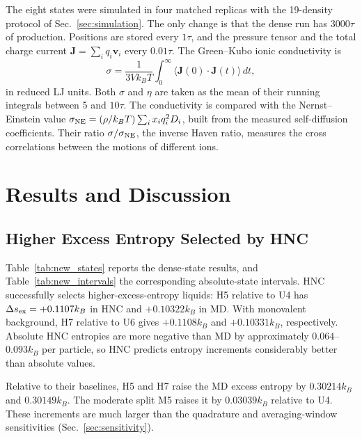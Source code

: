 \documentclass[aps,pre,twocolumn,superscriptaddress,floatfix]{revtex4-2}
\begin{document}
The eight states were simulated in four matched replicas with the 19-density protocol of Sec.~\ref{sec:simulation}. The only change is that the dense run has $3000\tau$ of production. Positions are stored every $1\tau$, and the pressure tensor and the total charge current $\mathbf J=\sum_i q_i\mathbf v_i$ every $0.01\tau$. The Green--Kubo ionic conductivity is
\begin{equation}
\sigma=\frac{1}{3Vk_BT}\int_0^\infty\langle\mathbf J(0)\cdot\mathbf J(t)\rangle\,dt,
\label{eq:gk_conductivity}
\end{equation}
in reduced LJ units. Both $\sigma$ and $\eta$ are taken as the mean of their running integrals between 5 and $10\tau$. The conductivity is compared with the Nernst--Einstein value $\sigma_{\rm NE}=(\rho/k_BT)\sum_ix_iq_i^2D_i$, built from the measured self-diffusion coefficients. Their ratio $\sigma/\sigma_{\rm NE}$, the inverse Haven ratio, measures the cross correlations between the motions of different ions.



\section{Results and Discussion}
\label{sec:results}

\subsection{Higher Excess Entropy Selected by HNC}

Table~\ref{tab:new_states} reports the dense-state results, and Table~\ref{tab:new_intervals} the corresponding absolute-state intervals. HNC successfully selects higher-excess-entropy liquids: H5 relative to U4 has $\Delta s_{\rm ex}=+0.1107k_B$ in HNC and $+0.10322k_B$ in MD. With monovalent background, H7 relative to U6 gives $+0.1108k_B$ and $+0.10331k_B$, respectively. Absolute HNC entropies are more negative than MD by approximately $0.064$--$0.093k_B$ per particle, so HNC predicts entropy increments considerably better than absolute values.





Relative to their baselines, H5 and H7 raise the MD excess entropy by $0.30214k_B$ and $0.30149k_B$. The moderate split M5 raises it by $0.03039k_B$ relative to U4. These increments are much larger than the quadrature and averaging-window sensitivities (Sec.~\ref{sec:sensitivity}).
\end{document}
